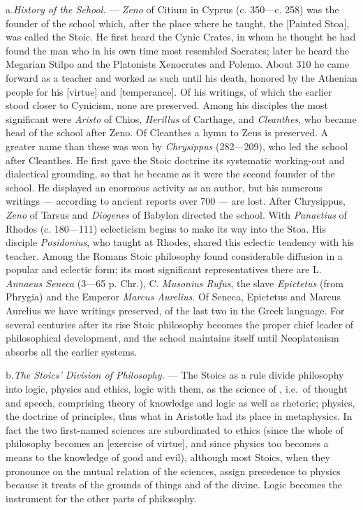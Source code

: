 a.\enspace \emph{History of the School.} --- \emph{Zeno} of Citium in Cyprus
(c. 350---c. 258) was the founder of the school which, after the place where
he taught, the  [Painted Stoa], was called the Stoic. He
first heard the Cynic Crates, in whom he thought he had found the man who in
his own time most resembled Socrates; later he heard the Megarian Stilpo and
the Platonists Xenocrates and Polemo. About 310 he came forward as a teacher
and worked as such until his death, honored by the Athenian people for his
 [virtue] and  [temperance]. Of his writings, of which
the earlier stood closer to Cynicism, none are preserved. Among his disciples
the most significant were \emph{Aristo} of Chios, \emph{Herillus} of
Carthage, and \emph{Cleanthes}, who became head of the school after Zeno. Of
Cleanthes a hymn to Zeus is preserved. A greater name than these was won by
\emph{Chrysippus} (282---209), who led the school after Cleanthes. He first
gave the Stoic doctrine its systematic working-out and dialectical grounding,
so that he became as it were the second founder of the school. He displayed an
enormous activity as an author, but his numerous writings --- according to
ancient reports over 700 --- are lost. After Chrysippus, \emph{Zeno} of Tarsus
and \emph{Diogenes} of Babylon directed the school. With \emph{Panaetius} of
Rhodes (c. 180---111) eclecticism begins to make its way into the Stoa. His
disciple \emph{Posidonius}, who taught at Rhodes, shared this eclectic
tendency with his teacher. Among the Romans Stoic philosophy found
considerable diffusion in a popular and eclectic form; its most significant
representatives there are L. \emph{Annaeus Seneca} (3---65 p. Chr.), C.
\emph{Musonius Rufus}, the slave \emph{Epictetus} (from Phrygia)
and the Emperor \emph{Marcus Aurelius}. Of Seneca, Epictetus and Marcus
Aurelius we have writings preserved, of the last two in the Greek language.
For several centuries after its rise Stoic philosophy becomes the proper chief
leader of philosophical development, and the school maintains itself until
Neoplatonism absorbs all the earlier systems.

\divrule

b.\enspace \emph{The Stoics' Division of Philosophy.} --- The Stoics as a rule
divide philosophy into logic, physics and ethics, logic with them, as the
science of , i.e.\ of thought and speech, comprising theory of
knowledge and logic as well as rhetoric; physics, the doctrine of principles,
thus what in Aristotle had its place in metaphysics. In fact the two
first-named sciences are subordinated to ethics (since the whole of philosophy
becomes an  [exercise of virtue], and since physics too
becomes a means to the knowledge of good and evil), although most Stoics, when
they pronounce on the mutual relation of the sciences, assign precedence to
physics because it treats of the grounds of things and of the divine. Logic
becomes the instrument for the other parts of philosophy.

